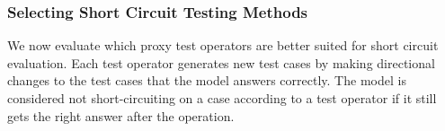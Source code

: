 

\iffalse

\subsubsection{Selecting Short Circuit Testing Methods}
\label{sec:select-sc}
We now evaluate which proxy test operators are better suited for short circuit evaluation.
Each test operator generates new test cases by making directional changes to
the test cases that the model answers correctly. 
The model is considered not short-circuiting on a case according 
to a test operator if it still gets the right answer after the operation. 

